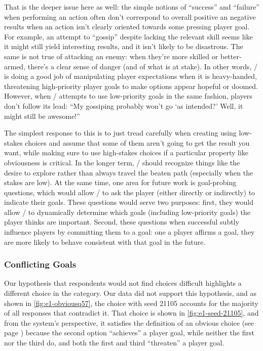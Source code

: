 That is the deeper issue here as well: the simple notions of ``success'' and ``failure'' when performing an action often don't correspond to overall positive an negative results when an action isn't clearly oriented towards some pressing player goal.
%
For example, an attempt to ``gossip'' despite lacking the relevant skill seems like it might still yield interesting results, and it isn't likely to be disastrous.
%
The same is not true of attacking an enemy: when they're more skilled or better-armed, there's a clear sense of danger (and of what is at stake).
%
In other words, \dunyazad/ is doing a good job of manipulating player expectations when it is heavy-handed, threatening high-priority player goals to make options appear hopeful or doomed.
%
However, when \dunyazad/ attempts to use low-priority goals in the same fashion, players don't follow its lead: ``My gossiping probably won't go `as intended?' Well, it might still be awesome!''


The simplest response to this is to just tread carefully when creating using low-stakes choices and assume that some of them aren't going to get the result you want, while making sure to use high-stakes choices if a particular property like obviousness is critical.
%
In the longer term, \dunyazad/ should recognize things like the desire to explore rather than always travel the beaten path (especially when the stakes are low).
%
At the same time, one area for future work is goal-probing questions, which would allow \dunyazad/ to ask the player (either directly or indirectly) to indicate their goals.
%
These questions would serve two purposes: first, they would allow \dunyazad/ to dynamically determine which goals (including low-priority goals) the player thinks are important.
%
Second, these questions when successful subtly influence players by committing them to a goal: one a player affirms a goal, they are more likely to behave consistent with that goal in the future.


\subsubsection{Conflicting Goals}


Our hypothesis that respondents would not find \obv{} choices difficult highlights a different choice in the \obv{} category.
%
Our data did not support this hypothesis, and as shown in \cref{fig:e1-obviousq57}, the choice with seed 21105 accounts for the majority of all responses that contradict it.
%
That choice is shown in \cref{fig:e1-seed-21105}, and from the system's perspective, it satisfies the definition of an obvious choice (see page \pageref{page:choicetypes}) because the second option ``achieves'' a player goal, while neither the first nor the third do, and both the first and third ``threaten'' a player goal.


